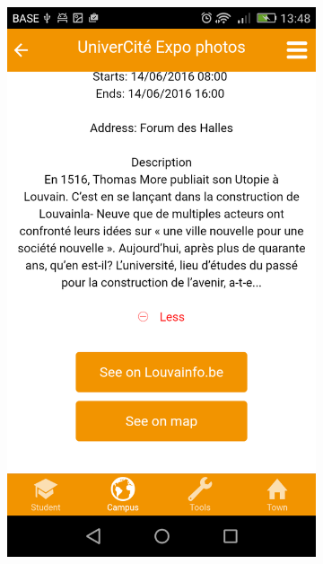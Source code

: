 \documentclass{eplmastersthesis}
\begin{document}
\begin{figure}
    \centering
\begin{subfigure}[b]{0.3\textwidth}
        \includegraphics[width=\textwidth]{Images/Application_screens/Screenshot_2016-06-06-13-48-40.png}
    \end{subfigure}
    ~ %
    \begin{subfigure}[b]{0.3\textwidth}

\end{subfigure}
\end{figure}
\end{document}
